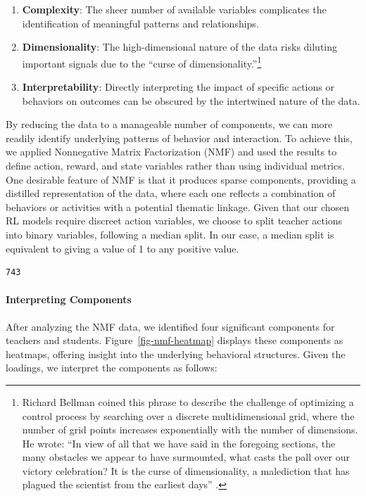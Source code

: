 \documentclass[
  number,
  preprint,
  3p,
  onecolumn]{elsarticle}
\let\oldparagraph\paragraph
\renewcommand{\paragraph}[1]{\oldparagraph{#1}\mbox{}}
\providecommand{\tightlist}{%
  \setlength{\itemsep}{0pt}\setlength{\parskip}{0pt}}\usepackage{longtable,booktabs,array}
\begin{document}
\begin{enumerate}
\def\labelenumi{\arabic{enumi}.}
\tightlist
\item
  \textbf{Complexity}: The sheer number of available variables
  complicates the identification of meaningful patterns and
  relationships.
\item
  \textbf{Dimensionality}: The high-dimensional nature of the data risks
  diluting important signals due to the ``curse of
  dimensionality.''\footnote{Richard Bellman coined this phrase to
    describe the challenge of optimizing a control process by searching
    over a discrete multidimensional grid, where the number of grid
    points increases exponentially with the number of dimensions. He
    wrote: ``In view of all that we have said in the foregoing sections,
    the many obstacles we appear to have surmounted, what casts the pall
    over our victory celebration? It is the curse of dimensionality, a
    malediction that has plagued the scientist from the earliest days''
    \citep{bellman2015adaptive}.}
\item
  \textbf{Interpretability}: Directly interpreting the impact of
  specific actions or behaviors on outcomes can be obscured by the
  intertwined nature of the data.
\end{enumerate}

By reducing the data to a manageable number of components, we can more
readily identify underlying patterns of behavior and interaction. To
achieve this, we applied Nonnegative Matrix Factorization (NMF) and used
the results to define action, reward, and state variables rather than
using individual metrics. One desirable feature of NMF is that it
produces sparse components, providing a distilled representation of the
data, where each one reflects a combination of behaviors or activities
with a potential thematic linkage. Given that our chosen RL models
require discreet action variables, we choose to split teacher actions
into binary variables, following a median split. In our case, a median
split is equivalent to giving a value of 1 to any positive value.

\begin{verbatim}
743
\end{verbatim}

\paragraph{Interpreting Components}\label{interpreting-components}

After analyzing the NMF data, we identified four significant components
for teachers and students. Figure~\ref{fig-nmf-heatmap} displays these
components as heatmaps, offering insight into the underlying behavioral
structures. Given the loadings, we interpret the components as follows:
\end{document}
